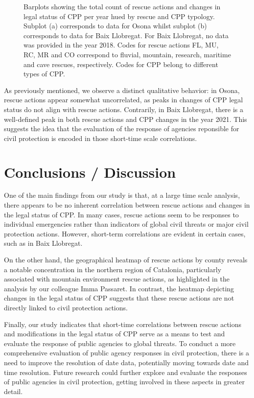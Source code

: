 \documentclass[
  journal=small,
  manuscript=mini-article,  %
  year=2023,
  volume=1,
]{odj-journal}
\begin{document}
\begin{figure}
\begin{subfigure}{0.47\textwidth}
\caption{}
\label{fig:sub2}
\end{subfigure}
\caption{Barplots showing the total count of rescue actions and changes in legal status of CPP per year hued by rescue and CPP typology. Subplot (a) corresponds to data for Osona whilst subplot (b) corresponds to data for Baix Llobregat. For Baix Llobregat, no data was provided in the year 2018. Codes for rescue actions FL, MU, RC, MR and CO correspond to fluvial, mountain, research, maritime and cave rescues, respectively. Codes for CPP belong to different types of CPP.}
\end{figure}
As previously mentioned, we observe a distinct qualitative behavior: in Osona, rescue actions appear somewhat uncorrelated, as peaks in changes of CPP legal status do not align with rescue actions. Contrarily, in Baix Llobregat, there is a well-defined peak in both rescue actions and CPP changes in the year 2021. This suggests the idea that the evaluation of the response of agencies reponsible for civil protection is encoded in those short-time scale correlations.

\section{Conclusions / Discussion}\label{sec:conclusions}
One of the main findings from our study is that, at a large time scale analysis, there appears to be no inherent correlation between rescue actions and changes in the legal status of CPP. In many cases, rescue actions seem to be responses to individual emergencies rather than indicators of global civil threats or major civil protection actions. However, short-term correlations are evident in certain cases, such as in Baix Llobregat.

On the other hand, the geographical heatmap of rescue actions by county reveals a notable concentration in the northern region of Catalonia, particularly associated with mountain environment rescue actions, as highlighted in the analysis by our colleague Imma Passaret. In contrast, the heatmap depicting changes in the legal status of CPP suggests that these rescue actions are not directly linked to civil protection actions.

Finally, our study indicates that short-time correlations between rescue actions and modifications in the legal status of CPP serve as a means to test and evaluate the response of public agencies to global threats. To conduct a more comprehensive evaluation of public agency responses in civil protection, there is a need to improve the resolution of date data, potentially moving towards date and time resolution. Future research could further explore and evaluate the responses of public agencies in civil protection, getting involved in these aspects in greater detail.





\end{document}
